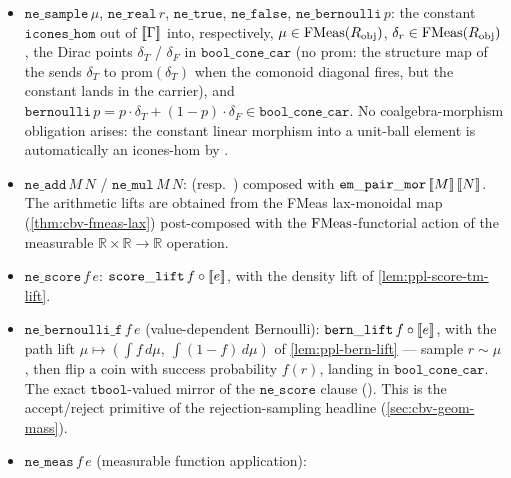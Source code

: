 \begin{itemize}
    the context with the value of $M$, and the continuation $K$ is
    interpreted in the extended context. There is no Moggi-bind
    intermediate.
  \item $\mathtt{ne\_sample}\,\mu$, $\mathtt{ne\_real}\,r$,
    $\mathtt{ne\_true}$, $\mathtt{ne\_false}$,
    $\mathtt{ne\_bernoulli}\,p$: the constant $\mathtt{icones\_hom}$
     out of $[\![ \Gamma ]\!]$ into,
    respectively, $\mu \in \mathrm{FMeas}(R_\mathrm{obj})$,
    $\delta_r \in \mathrm{FMeas}(R_\mathrm{obj})$, the Dirac points
    $\delta_T$ / $\delta_F$ in $\mathtt{bool\_cone\_car}$ (no
    $\mathrm{prom}$: the structure map of the
    sends $\delta_T$ to $\mathrm{prom}(\delta_T)$ when the comonoid
    diagonal fires, but the constant lands in the carrier), and
    $\mathtt{bernoulli}\,p = p \cdot \delta_T + (1-p) \cdot \delta_F
    \in \mathtt{bool\_cone\_car}$. No coalgebra-morphism obligation
    arises: the constant linear morphism into a unit-ball element is
    automatically an icones-hom by
    .
  \item $\mathtt{ne\_add}\,M\,N$ / $\mathtt{ne\_mul}\,M\,N$:
     (resp.\
    ) composed with
    $\mathtt{em\_pair\_mor}\,[\![ M ]\!]\,[\![ N ]\!]$. The arithmetic lifts
    are obtained from the FMeas lax-monoidal map
    (\autoref{thm:cbv-fmeas-lax}) post-composed with the
    $\mathrm{FMeas}$-functorial action of the measurable
    $\mathbb{R}\times\mathbb{R}\to\mathbb{R}$ operation.
  \item $\mathtt{ne\_score}\,f\,e$:
    $\mathtt{score\_lift}\,f \circ [\![ e ]\!]$, with
     the density lift of
    \autoref{lem:ppl-score-tm-lift}.
  \item $\mathtt{ne\_bernoulli\_f}\,f\,e$ (value-dependent Bernoulli):
    $\mathtt{bern\_lift}\,f \circ [\![ e ]\!]$, with
     the path lift
    $\mu \mapsto (\int f\,d\mu,\ \int (1 - f)\,d\mu)$ of
    \autoref{lem:ppl-bern-lift} --- sample $r \sim \mu$, then flip a
    coin with success probability $f(r)$, landing in
    $\mathtt{bool\_cone\_car}$. The exact $\mathtt{tbool}$-valued
    mirror of the $\mathtt{ne\_score}$ clause
    (). This is the
    accept/reject primitive of the rejection-sampling headline
    (\autoref{sec:cbv-geom-mass}).
  \item $\mathtt{ne\_meas}\,f\,e$ (measurable function application):

\end{itemize}
